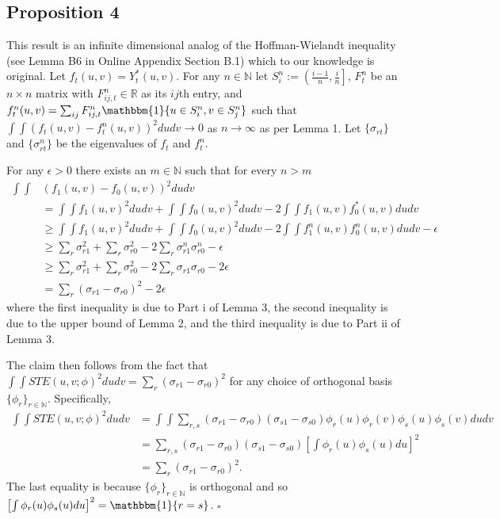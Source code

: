 \documentclass[12pt]{article}
\theoremstyle{definition}
\begin{document}
\subsection{Proposition 4}
This result is an infinite dimensional analog of the Hoffman-Wielandt inequality (see Lemma B6 in Online Appendix Section B.1) which to our knowledge is original. Let $f_{t}(u,v) = Y_{t}^{*}(u,v)$. For any $n\in \mathbb{N}$ let $S_{i}^{n} := \left(\frac{i-1}{n},\frac{i}{n}\right]$, $F_{t}^{n}$ be an $n\times n$ matrix with $F_{ij,t}^{n} \in \mathbb{R}$ as its $ij$th entry, and $f_{t}^{n}(u,v) = \sum_{ij}F_{ij,t}^{n}\mathbbm{1}\{u \in S_{i}^{n}, v \in S_{j}^{n}\}$ such that $\int\int\left(f_{t}(u,v)-f_{t}^{n}(u,v)\right)^{2}dudv \to 0$ as $n\to\infty$ as per Lemma 1. Let $\{\sigma_{rt}\}$ and $\{\sigma_{rt}^{n}\}$ be the eigenvalues of $f_{t}$ and $f_{t}^{n}$. 

 For any $\epsilon > 0$ there exists an $m \in \mathbb{N}$ such that for every $n > m$
\begin{align*}
\int\int&(f_{1}(u,v)-f_{0}(u,v))^{2}dudv \\ 
&= \int\int f_{1}(u,v)^{2}dudv + \int\int f_{0}(u,v)^{2}dudv - 2\int\int f_{1}(u,v)f_{0}^{*}(u,v)dudv \\
&\geq \int\int f_{1}(u,v)^{2}dudv + \int\int f_{0}(u,v)^{2}dudv - 2\int\int f^{n}_{1}(u,v)f^{n}_{0}(u,v)dudv - \epsilon \\
&\geq \sum_{r}\sigma_{r1}^{2} + \sum_{r}\sigma_{r0}^{2} - 2\sum_{r}\sigma^{n}_{r1}\sigma^{n}_{r0} - \epsilon \\
&\geq \sum_{r}\sigma_{r1}^{2} + \sum_{r}\sigma_{r0}^{2} - 2\sum_{r}\sigma_{r1}\sigma_{r0} - 2\epsilon\\
&= \sum_{r}(\sigma_{r1}-\sigma_{r0})^{2} - 2\epsilon
\end{align*}
where the first inequality is due to Part i of Lemma 3, the second inequality is due to the upper bound of Lemma 2, and the third inequality is due to Part ii of Lemma 3.  \newline

The claim then follows from the fact that $\int\int STE(u,v;\phi)^{2}dudv =  \sum_{r}(\sigma_{r1}-\sigma_{r0})^{2}$ for any choice of orthogonal basis $\{\phi_{r}\}_{r\in \mathbb{N}}$. Specifically,  
\begin{align*}
\int\int STE(u,v;\phi)^{2}dudv 
&= \int\int\sum_{r,s}(\sigma_{r1}-\sigma_{r0})(\sigma_{s1}-\sigma_{s0})\phi_{r}(u)\phi_{r}(v)\phi_{s}(u)\phi_{s}(v)dudv \\
&= \sum_{r,s}(\sigma_{r1}-\sigma_{r0})(\sigma_{s1}-\sigma_{s0}) \left[\int\phi_{r}(u)\phi_{s}(u)du\right]^{2} \\
&=  \sum_{r}(\sigma_{r1}-\sigma_{r0})^{2}.
\end{align*}
The last equality is because  $\{\phi_{r}\}_{r\in \mathbb{N}}$ is orthogonal and so $\left[\int\phi_{r}(u)\phi_{s}(u)du\right]^{2} = \mathbbm{1}\{r=s\}$. $\square$
\end{document}
